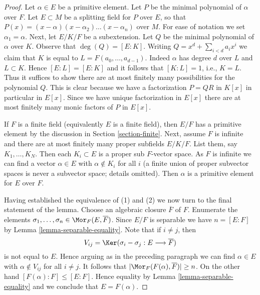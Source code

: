 \begin{proof}
Let $\alpha \in E$ be a primitive element. Let $P$ be the minimal
polynomial of $\alpha$ over $F$. Let $E \subset M$ be a splitting
field for $P$ over $E$, so that
$P(x) = (x - \alpha)(x - \alpha_2) \ldots (x - \alpha_n)$ over $M$.
For ease of notation we set $\alpha_1 = \alpha$.
Next, let $E/K/F$ be a subextension. Let $Q$ be the minimal
polynomial of $\alpha$ over $K$. Observe that $\deg(Q) = [E : K]$.
Writing $Q = x^d + \sum_{i < d} a_i x^i$ we claim that
$K$ is equal to $L = F(a_0, \ldots, a_{d - 1})$. Indeed $\alpha$ has degree
$d$ over $L$ and $L \subset K$. Hence $[E : L] = [E : K]$ and it follows
that $[K : L] = 1$, i.e., $K = L$.
Thus it suffices to show there are at most finitely many possibilities
for the polynomial $Q$. This is clear because we have a factorization
$P = QR$  in $K[x]$ in particular in $E[x]$. Since we have unique
factorization in $E[x]$ there are at most finitely many monic
factors of $P$ in $E[x]$.

\medskip\noindent
If $F$ is a finite field (equivalently $E$ is a finite field), then
$E/F$ has a primitive element by the discussion in
Section \ref{section-finite}.
Next, assume $F$ is infinite and there are at most finitely many proper
subfields $E/K/F$. List them, say $K_1, \ldots, K_N$. Then
each $K_i \subset E$ is a proper sub $F$-vector space. As $F$ is infinite
we can find a vector $\alpha \in E$ with $\alpha \not \in K_i$ for all $i$
(a finite union of proper subvector spaces is never a subvector space;
details omitted). Then $\alpha$ is a primitive element for $E$ over $F$.

\medskip\noindent
Having established the equivalence of (1) and (2) we now turn to
the final statement of the lemma. Choose an algebraic closure
$\overline{F}$ of $F$. Enumerate the elements
$\sigma_1, \ldots, \sigma_n \in \Mor_F(E, \overline{F})$.
Since $E/F$ is separable we have $n = [E : F]$ by
Lemma \ref{lemma-separable-equality}.
Note that if $i \not = j$, then
$$
V_{ij} = \Ker(\sigma_i - \sigma_j : E \longrightarrow \overline{F})
$$
is not equal to $E$. Hence arguing as in the preceding paragraph
we can find $\alpha \in E$ with $\alpha \not \in V_{ij}$ for all
$i \not = j$. It follows that $|\Mor_F(F(\alpha), \overline{F})| \geq n$.
On the other hand $[F(\alpha) : F] \leq [E : F]$. Hence equality
by Lemma \ref{lemma-separable-equality}
and we conclude that $E = F(\alpha)$.
\end{proof}










